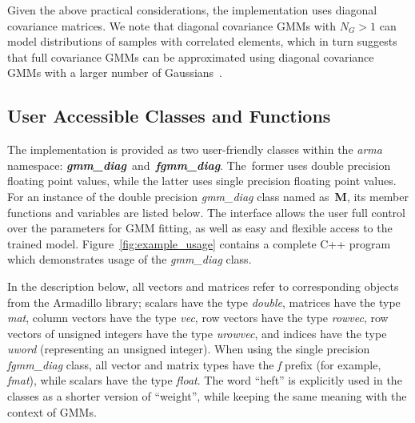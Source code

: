 Given the above practical considerations, the implementation uses diagonal covariance matrices.
We note that diagonal covariance GMMs with $N_G > 1$ can model distributions of samples with correlated elements,
which in turn suggests that full covariance GMMs can be approximated using diagonal covariance GMMs with a larger number of Gaussians~\cite{Reynolds_2000}.


\vspace{1ex}
\subsection{User Accessible Classes and Functions}

The implementation is provided as two user-friendly classes within the {\it arma} namespace:
{\it\bfseries gmm\_diag}~and~{\it\bfseries fgmm\_diag}.
The~former uses double precision floating point values, while the latter uses single precision floating point values.
For an instance of the double precision {\it gmm\_diag} class named as~{\bf M},
its member functions and variables are listed below.
The interface allows the user full control over the parameters for GMM fitting,
as well as easy and flexible access to the trained model.
Figure~\ref{fig:example_usage} contains a complete C++ program which demonstrates usage of the {\it gmm\_diag} class.

In the description below, all vectors and matrices refer to corresponding objects from the Armadillo library;
scalars have the type {\it double},
matrices have the type {\it mat},
column vectors have the type {\it vec},
row vectors have the type {\it rowvec},
row vectors of unsigned integers have the type {\it urowvec},
and indices have the type {\it uword} (representing an unsigned integer).
When using the single precision {\it fgmm\_diag} class,
all vector and matrix types have the {\it f} prefix (for example, {\it fmat}),
while scalars have the type {\it float}.
The word ``heft'' is explicitly used in the classes as a shorter version of ``weight'', while keeping the same meaning with the context of GMMs.

